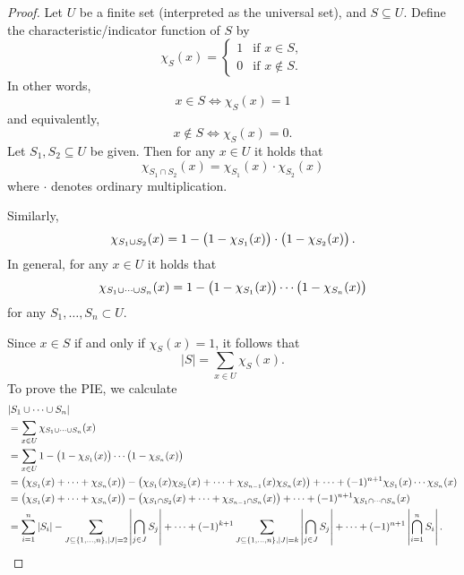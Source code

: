 \begin{proof}
Let $U$ be a finite set (interpreted as the universal set), and $S\subseteq U$. Define the characteristic/indicator function of $S$ by
\[ \chi_S(x)=\begin{cases}
1&\text{if }x\in S,\\
0&\text{if }x\notin S.
\end{cases} \]
In other words,
\[ x\in S\iff\chi_S(x)=1 \]
and equivalently,
\[ x\notin S\iff\chi_S(x)=0. \]
Let $S_1,S_2\subseteq U$ be given. Then for any $x\in U$ it holds that
\[ \chi_{S_1\cap S_2}(x)=\chi_{S_1}(x)\cdot\chi_{S_2}(x) \]
where $\cdot$ denotes ordinary multiplication.

Similarly,
\[ \chi_{S_1\cup S_2}(x)=1-\left(1-\chi_{S_1}(x)\right)\cdot\left(1-\chi_{S_2}(x)\right). \]
In general, for any $x\in U$ it holds that
\[ \chi_{S_1\cup\cdots\cup S_n}(x)=1-\left(1-\chi_{S_1}(x)\right)\cdots\left(1-\chi_{S_n}(x)\right) \]
for any $S_1,\dots,S_n\subset U$.

Since $x\in S$ if and only if $\chi_S(x)=1$, it follows that
\[ |S|=\sum_{x\in U}\chi_S(x). \]
To prove the PIE, we calculate
\begin{align*}
&|S_1\cup\cdots\cup S_n|\\
&=\sum_{x\in U}\chi_{S_1\cup\cdots\cup S_n}(x)\\
&=\sum_{x\in U}1-\left(1-\chi_{S_1}(x)\right)\cdots\left(1-\chi_{S_n}(x)\right)\\
&=\left(\chi_{S_1}(x)+\cdots+\chi_{S_n}(x)\right)-\left(\chi_{S_1}(x)\chi_{S_2}(x)+\cdots+\chi_{S_{n-1}}(x)\chi_{S_n}(x)\right)+\cdots+(-1)^{n+1}\chi_{S_1}(x)\cdots\chi_{S_n}(x)\\
&=\left(\chi_{S_1}(x)+\cdots+\chi_{S_n}(x)\right)-\left(\chi_{S_1\cap S_2}(x)+\cdots+\chi_{S_{n-1}\cap S_n}(x)\right)+\cdots+(-1)^{n+1}\chi_{S_1\cap\cdots\cap S_n}(x)\\
&=\sum_{i=1}^n|S_i|-\sum_{J\subseteq\{1,\dots,n\},|J|=2}\left|\bigcap_{j\in J}S_j\right|+\cdots+(-1)^{k+1}\sum_{J\subseteq\{1,\dots,n\},|J|=k}\left|\bigcap_{j\in J}S_j\right|+\cdots+(-1)^{n+1}\left|\bigcap_{i=1}^nS_i\right|.
\end{align*}
\end{proof}


